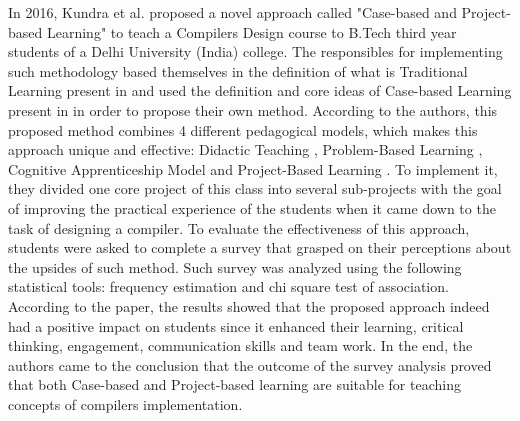 In 2016, Kundra et al. \cite{kundra2016experience} proposed a novel approach called "Case-based and Project-based Learning" to teach a Compilers Design course to B.Tech third year students of a Delhi University (India) college. The responsibles for implementing such methodology based themselves in the definition of what is Traditional Learning present in \cite{altman2010workplace} and used the definition and core ideas of Case-based Learning present in \cite{golich2000abcs} in order to propose their own method. According to the authors, this proposed method combines 4 different pedagogical models, which makes this approach unique and effective: Didactic Teaching \cite{altman2010workplace}, Problem-Based Learning \cite{hmelo2004problem}, Cognitive Apprenticeship Model \cite{dennen2008cognitive} and Project-Based Learning \cite{thomas2000review}. To implement it, they divided one core project of this class into several sub-projects with the goal of improving the practical experience of the students when it came down to the task of designing a compiler. To evaluate the effectiveness of this approach, students were asked to complete a survey that grasped on their perceptions about the upsides of such method. Such survey was analyzed using the following statistical tools: frequency estimation and chi square test of association. According to the paper, the results showed that the proposed approach indeed had a positive impact on students since it enhanced their learning, critical thinking, engagement, communication skills and team work. In the end, the authors came to the conclusion that the outcome of the survey analysis proved that both Case-based and Project-based learning are suitable for teaching concepts of compilers implementation.

